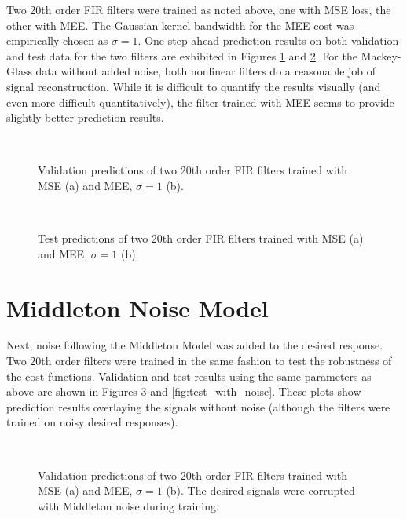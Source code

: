 \documentclass{article}[12 pt]
\begin{document}
Two 20th order FIR filters were trained as noted above, one with MSE loss, the other with MEE.  The Gaussian kernel bandwidth for the MEE cost was empirically chosen as $\sigma=1$.  One-step-ahead prediction results on both validation and test data for the two filters are exhibited in Figures \ref*{fig:validation_no_noise} and \ref{fig:test_no_noise}.  For the Mackey-Glass data without added noise, both nonlinear filters do a reasonable job of signal reconstruction.  While it is difficult to quantify the results visually (and even more difficult quantitatively), the filter trained with MEE seems to provide slightly better prediction results.

\begin{figure}[h]
	\centering
	\quad
	\\
	\caption{Validation predictions of two 20th order FIR filters trained with MSE (a) and MEE, $\sigma=1$ (b).}
	\label{fig:validation_no_noise}
\end{figure}

\begin{figure}[h]
	\centering
	\quad
	\\
	\caption{Test predictions of two 20th order FIR filters trained with MSE (a) and MEE, $\sigma=1$ (b).}
	\label{fig:test_no_noise}
\end{figure}

\section{Middleton Noise Model}
Next, noise following the Middleton Model was added to the desired response.  Two 20th order filters were trained in the same fashion to test the robustness of the cost functions.  Validation and test results using the same parameters as above are shown in Figures \ref{fig:validation_with_noise} and \ref{fig:test_with_noise}.  These plots show prediction results overlaying the signals without noise (although the filters were trained on noisy desired responses). 

\begin{figure}[H]
	\centering
	\quad
	\\
	\caption{Validation predictions of two 20th order FIR filters trained with MSE (a) and MEE, $\sigma=1$ (b).  The desired signals were corrupted with Middleton noise during training.}
	\label{fig:validation_with_noise}
\end{figure}
\end{document}
